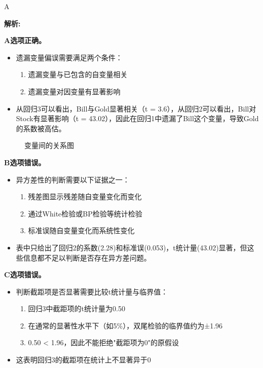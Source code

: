 \documentclass{article}
\newenvironment{explanation}
{\textbf{解析:}\par}
{\par}
\begin{document}
\begin{correctanswer}
A
\end{correctanswer}

\begin{explanation}
\textbf{A选项正确。}
\begin{itemize}
    \item 遗漏变量偏误需要满足两个条件：
    \begin{enumerate}
        \item 遗漏变量与已包含的自变量相关
        \item 遗漏变量对因变量有显著影响
    \end{enumerate}
    
    \item 从回归3可以看出，Bill与Gold显著相关（t = 3.6），从回归2可以看出，Bill对Stock有显著影响（t = 43.02），因此在回归1中遗漏了Bill这个变量，导致Gold的系数被高估。
\end{itemize}

\begin{figure}[H]
\centering
{}
\caption{变量间的关系图}
\end{figure}


\textbf{B选项错误。}
\begin{itemize}
    \item 异方差性的判断需要以下证据之一：
    \begin{enumerate}
        \item 残差图显示残差随自变量变化而变化
        \item 通过White检验或BP检验等统计检验
        \item 标准误随自变量变化而系统性变化
    \end{enumerate}
    \item 表中只给出了回归2的系数(2.28)和标准误(0.053)，t统计量(43.02)显著，但这些信息都不足以判断是否存在异方差问题。
\end{itemize}

\textbf{C选项错误。}
\begin{itemize}
    \item 判断截距项是否显著需要比较t统计量与临界值：
    \begin{enumerate}
        \item 回归3中截距项的t统计量为0.50
        \item 在通常的显著性水平下（如5\%），双尾检验的临界值约为±1.96
        \item 0.50 < 1.96，因此不能拒绝"截距项为0"的原假设
    \end{enumerate}
    \item 这表明回归3的截距项在统计上不显著异于0
\end{itemize}


\end{explanation}
\end{document}
